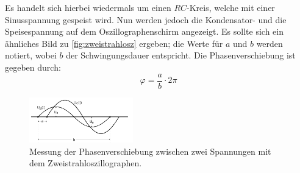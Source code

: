     \noindent Es handelt sich hierbei wiedermals um einen $RC$-Kreis, welche mit einer Sinusspannung gespeist wird. Nun werden jedoch die Kondensator- und die 
    Speisespannung auf dem Oszillographenschirm angezeigt. Es sollte sich ein ähnliches Bild zu \autoref{fig:zweistrahlosz} ergeben; die Werte für $a$ und $b$
    werden notiert, wobei $b$ der Schwingungsdauer entspricht. Die Phasenverschiebung ist gegeben durch:
    \begin{equation}
        \label{eqn:phi}
        \varphi = \frac{a}{b} \cdot 2 \pi
    \end{equation}

    \begin{figure}
        \centering
        \includegraphics[width=0.4\textwidth]{bilder/Zweistrahloszillograph.PNG}
        \caption{Messung der Phasenverschiebung zwischen zwei Spannungen mit dem Zweistrahloszillographen.}
        \label{fig:zweistrahlosz}
    \end{figure}